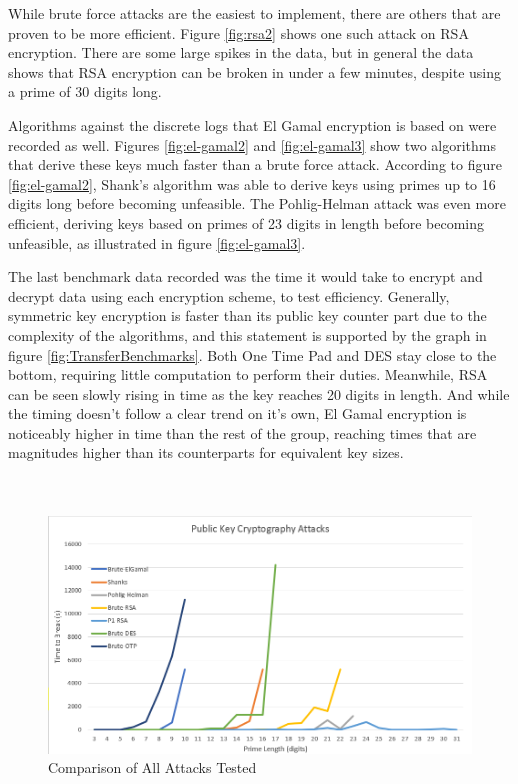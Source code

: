 \documentclass[12pt]{report}
\begin{document}
While brute force attacks are the easiest to implement, there are others that are proven to be more efficient. Figure \ref{fig:rsa2} shows one such attack on RSA encryption.
There are some large spikes in the data, but in general the data shows that RSA encryption can be broken in under a few minutes, despite using a prime of 30 digits long.

Algorithms against the discrete logs that El Gamal encryption is based on were recorded as well. Figures \ref{fig:el-gamal2} and \ref{fig:el-gamal3} show two algorithms
that derive these keys much faster than a brute force attack. According to figure \ref{fig:el-gamal2}, Shank's algorithm was able to derive keys using primes up to 16
digits long before becoming unfeasible. The Pohlig-Helman attack was even more efficient, deriving keys based on primes of 23 digits in length before becoming unfeasible,
as illustrated in figure \ref{fig:el-gamal3}.

The last benchmark data recorded was the time it would take to encrypt and decrypt data using each encryption scheme, to test efficiency. Generally, symmetric key encryption
is faster than its public key counter part due to the complexity of the algorithms, and this statement is supported by the graph in figure \ref{fig:TransferBenchmarks}. Both
One Time Pad and DES stay close to the bottom, requiring little computation to perform their duties. Meanwhile, RSA can be seen slowly rising in time as the key reaches 20
digits in length. And while the timing doesn't follow a clear trend on it's own, El Gamal encryption is noticeably higher in time than the rest of the group, reaching times
that are magnitudes higher than its counterparts for equivalent key sizes.
\\
\\
\\

\begin{figure}[hp!] %
    \begin{center}
        \includegraphics[width=0.85\linewidth]{AllAttack.PNG}
        \caption{Comparison of All Attacks Tested}
        \label{fig:allattack}
    \end{center}
\end{figure}
\end{document}
